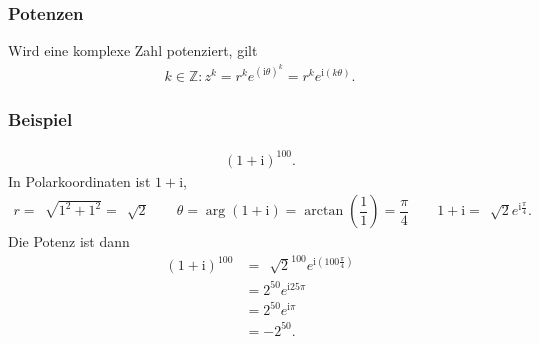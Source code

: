\documentclass[a4paper,12pt]{article}
\numberwithin{equation}{section}
\begin{document}
\subsubsection{Potenzen}
Wird eine komplexe Zahl potenziert, gilt
\begin{align} 
        k \in \mathbb{Z}:z^k=r^ke^{\left(\text{i}\theta \right)^k}=r^ke^{\text{i}\left(k\theta \right)}
.\end{align} 

\subsubsection{Beispiel}
\begin{align} 
        \left(1+\text{i}\right)^{100}
.\end{align} 
In Polarkoordinaten ist $1+\text{i}$, 
\begin{align} 
        r=\,\sqrt[]{1^2+1^2}=\,\sqrt[]{2}\qquad \theta =\arg\left(1+\text{i}\right)=\arctan\left(\dfrac{1}{1}\right)=\dfrac{\pi }{4}\qquad 1+\text{i}=\,\sqrt[]{2}e^{\text{i}\tfrac{\pi }{4}}
.\end{align} 
Die Potenz ist dann
\begin{align} 
        \left(1+\text{i}\right)^{100}&=\,\sqrt[]{2}^{100}e^{\text{i}\left(100\tfrac{\pi }{4}\right)}\nonumber \\
                                     &=2^{50}e^{\text{i}25\pi }\nonumber \\
                                     &=2^{50}e^{\text{i}\pi }\nonumber \\ 
                                     &=-2^{50}
.\end{align} 

\end{document}

